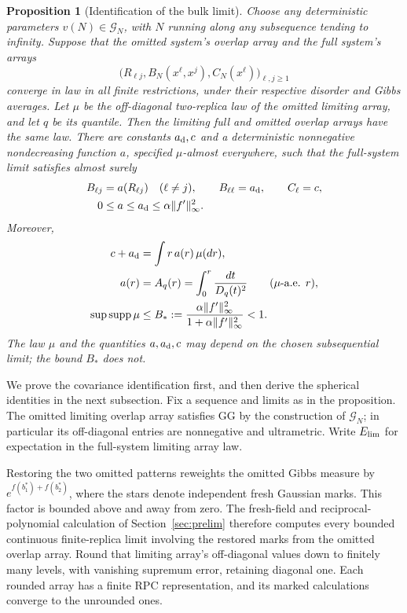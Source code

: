 \documentclass[11pt]{article}
\newtheorem{proposition}[theorem]{Proposition}
\begin{document}
\begin{proposition}[Identification of the bulk limit]\label{prop:bulk}
Choose any deterministic parameters $v(N)\in\mathcal G_N$, with $N$
running along any subsequence tending to infinity. Suppose that the omitted
system's overlap array and the full system's arrays
\[
 \big(R_{\ell j},B_N(x^\ell,x^j),C_N(x^\ell)\big)_{\ell,j\ge1}
\]
converge in law in all finite restrictions, under their respective disorder
and Gibbs averages. Let $\mu$ be the off-diagonal two-replica law of the
omitted limiting array, and let $q$ be its quantile. Then the limiting full
and omitted overlap arrays have the same law. There are constants
$a_{\rm d},c$ and a deterministic nonnegative nondecreasing function $a$,
specified $\mu$-almost everywhere, such that the full-system limit satisfies
almost surely
\begin{equation}\label{eq:bulk-identification}
\begin{aligned}
 B_{\ell j}&=a(R_{\ell j})\quad(\ell\ne j),\qquad
 B_{\ell\ell}=a_{\rm d},\qquad C_\ell=c,\\
 0&\le a\le a_{\rm d}\le\alpha\|f'\|_\infty^2.
\end{aligned}
\end{equation}
Moreover,
\begin{equation}\label{eq:self-consistency}
\begin{aligned}
 c+a_{\rm d}&=\int r\,a(r)\,\mu(dr),\\
 a(r)&=A_q(r)=\int_0^r\frac{dt}{D_q(t)^2}
                       \qquad(\mu\text{-a.e. }r),\\
 \sup\operatorname{supp}\mu&\le B_*:=
       \frac{\alpha\|f'\|_\infty^2}{1+\alpha\|f'\|_\infty^2}<1.
\end{aligned}
\end{equation}
The law $\mu$ and the quantities $a,a_{\rm d},c$ may depend on the chosen
subsequential limit; the bound $B_*$ does not.
\end{proposition}

We prove the covariance identification first, and then derive the spherical
identities in the next subsection. Fix a sequence and limits as in the
proposition. The omitted limiting overlap array satisfies GG by the
construction of $\mathcal G_N$; in particular its off-diagonal entries are
nonnegative and ultrametric. Write $E_{\rm lim}$ for expectation in the
full-system limiting array law.

Restoring the two omitted patterns reweights the omitted Gibbs measure by
$e^{f(b_1^*)+f(b_2^*)}$, where the stars denote independent fresh Gaussian
marks. This factor is bounded above and away from zero. The fresh-field
and reciprocal-polynomial calculation of Section~\ref{sec:prelim}
therefore computes every bounded continuous finite-replica limit involving
the restored marks from the omitted overlap array. Round that limiting
array's off-diagonal values down to finitely many levels, with vanishing
supremum error, retaining diagonal one. Each rounded array has a finite
RPC representation, and its marked calculations converge to the unrounded
ones.
\end{document}
